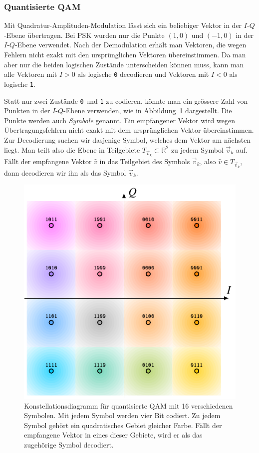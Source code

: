\subsubsection{Quantisierte QAM}
Mit Quadratur-Amplituden-Modulation lässt sich ein beliebiger Vektor
in der $I$-$Q$-Ebene übertragen.
Bei PSK wurden nur die Punkte $(1,0)$  und $(-1,0)$ in der $I$-$Q$-Ebene
verwendet.
Nach der Demodulation erhält man Vektoren, die wegen Fehlern nicht
exakt mit den ursprünglichen Vektoren übereinstimmen.
Da man aber nur die beiden logischen Zustände unterscheiden können muss,
kann man alle Vektoren mit $I>0$ als logische \texttt{0} decodieren
und Vektoren mit $I<0$ als logische \texttt{1}.

Statt nur zwei Zustände \texttt{0} und \texttt{1} zu codieren, könnte man
ein grössere Zahl von Punkten in der $I$-$Q$-Ebene verwenden, wie in
Abbildung~\ref{figure:qam:konstellation} dargestellt.
Die Punkte werden auch {\em Symbole} genannt.
Ein empfangener Vektor wird wegen Übertragungsfehlern nicht exakt mit
dem ursprünglichen Vektor übereinstimmen.
Zur Decodierung suchen wir dasjenige Symbol, welches dem Vektor am
nächsten liegt.
Man teilt also die Ebene in Teilgebiete $T_{\vec{v}_k}\subset \mathbb R^2$
zu jedem Symbol $\vec{v}_k$ auf.
Fällt der empfangene Vektor $\hat{v}$ in das Teilgebiet des Symbols
$\vec{v}_k$, also $\hat{v}\in T_{\vec{v}_k}$, dann decodieren wir ihn
als das Symbol $\vec{v}_k$.

\begin{figure}
\centering
\includegraphics{applications/qam/images/konstellation.pdf}
\caption{Konstellationsdiagramm für quantisierte QAM mit 16 verschiedenen
Symbolen.
Mit jedem Symbol werden vier Bit codiert.
Zu jedem Symbol gehört ein quadratisches Gebiet gleicher Farbe.
Fällt der empfangene Vektor in eines dieser Gebiete, wird er als
das zugehörige Symbol decodiert.
\label{figure:qam:konstellation}}
\end{figure}

